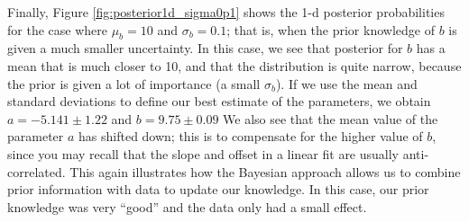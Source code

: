 Finally, Figure \ref{fig:posterior1d_sigma0p1} shows the 1-d posterior probabilities for the case where $\mu_b=10$ and $\sigma_b=0.1$; that is, when the prior knowledge of $b$ is given a much smaller uncertainty. In this case, we see that posterior for $b$ has a mean that is much closer to 10, and that the distribution is quite narrow, because the prior is given a lot of importance (a small $\sigma_b$). If we use the mean and standard deviations to define our best estimate of the parameters, we obtain $a=-5.141\pm1.22$ and $b=9.75 \pm 0.09$ We also see that the mean value of the parameter $a$ has shifted down; this is to compensate for the higher value of $b$, since you may recall that the slope and offset in a linear fit are usually anti-correlated. This again illustrates how the Bayesian approach allows us to combine prior information with data to update our knowledge. In this case, our prior knowledge was very ``good'' and the data only had a small effect.

